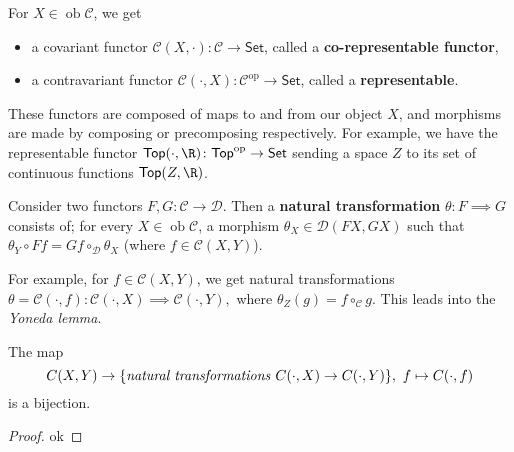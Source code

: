 \begin{definition}
    For $X \in \operatorname{ob}\mathcal{C} $, we get
    \begin{itemize}
    \setlength\itemsep{-.2em}
\item a covariant functor $\mathcal{C} (X,\cdot ) \colon \mathcal{C}  \to \mathsf{Set} $, called a \textbf{co-representable functor},
\item a contravariant functor $\mathcal{C} (\cdot, X ) \colon \mathcal{C}^{\mathrm{op}}  \to \mathsf{Set} $, called a \textbf{representable}.
    \end{itemize}
\end{definition}
These functors are composed of maps to and from our object $X$, and morphisms are made by composing or precomposing respectively. For example, we have the representable functor $\mathsf{Top} (\cdot ,\R) \colon \mathsf{Top} ^{\mathrm{op}} \to \mathsf{Set}$ sending a space $Z$ to its set of continuous functions $\mathsf{Top} (Z,\R)$.

\begin{definition}
   Consider two functors $F,G \colon \mathcal{C}  \to \mathcal{D}  $. Then a \textbf{natural transformation} $\theta \colon F\implies G $ consists of; for every $X \in \operatorname{ob}\mathcal{C} $, a morphism $\theta_X \in \mathcal{D} (FX,GX)$ such that $\theta_Y\circ Ff=Gf \circ _{\mathcal{D} }\theta_X$ (where $f \in \mathcal{C} (X,Y)$).
\end{definition}
   For example, for $f \in \mathcal{C} (X,Y)$, we get natural transformations $\theta=\mathcal{C} (\cdot ,f) \colon \mathcal{C} (\cdot ,X) \implies \mathcal{C} (\cdot ,Y),$ where $\theta_Z(g)=f \circ _{\mathcal{C} }g $. This leads into the \emph{Yoneda lemma}.

   \begin{lemma}
      The map \[
          C(X,Y) \to \{\text{\emph{natural transformations}}\ C(\cdot ,X) \to C(\cdot ,Y)\} ,\ f \mapsto C(\cdot ,f)
      \] is a bijection. 
   \end{lemma}
   \begin{proof}
       ok
   \end{proof}

